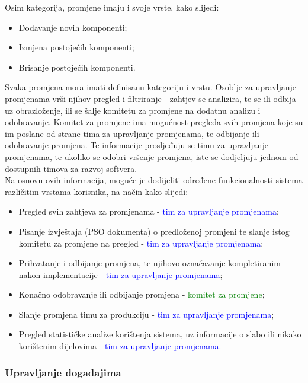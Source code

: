 \documentclass[12pt,a4paper]{article}
\begin{document}
Osim kategorija, promjene imaju i svoje vrste, kako slijedi:

\begin{itemize}
\renewcommand\labelitemi{-}
\item Dodavanje novih komponenti;
\item Izmjena postojećih komponenti;
\item Brisanje postojećih komponenti.
\end{itemize}

Svaka promjena mora imati definisanu kategoriju i vrstu. Osoblje za upravljanje promjenama vrši njihov pregled i filtriranje - zahtjev se analizira, te se ili odbija uz obrazloženje, ili se šalje komitetu za promjene na dodatnu analizu i odobravanje. Komitet za promjene ima mogućnost pregleda svih promjena koje su im poslane od strane tima za upravljanje promjenama, te odbijanje ili odobravanje promjena. Te informacije prosljeđuju se timu za upravljanje promjenama, te ukoliko se odobri vršenje promjena, iste se dodjeljuju jednom od dostupnih timova za razvoj softvera. \\

Na osnovu ovih informacija, moguće je dodijeliti određene funkcionalnosti sistema različitim vrstama korisnika, na način kako slijedi:

\begin{itemize}
\renewcommand\labelitemi{$\square$}
\item Pregled svih zahtjeva za promjenama - \textcolor{blue}{tim za upravljanje promjenama};
\item Pisanje izvještaja (PSO dokumenta) o predloženoj promjeni te slanje istog komitetu za promjene na pregled - \textcolor{blue}{tim za upravljanje promjenama};
\item Prihvatanje i odbijanje promjena, te njihovo označavanje kompletiranim nakon implementacije - \textcolor{blue}{tim za upravljanje promjenama};
\item Konačno odobravanje ili odbijanje promjena - \textcolor{green}{komitet za promjene};
\item Slanje promjena timu za produkciju - \textcolor{blue}{tim za upravljanje promjenama};
\item Pregled statističke analize korištenja sistema, uz informacije o slabo ili nikako korištenim dijelovima - \textcolor{blue}{tim za upravljanje promjenama}.
\end{itemize}

\subsubsection{Upravljanje događajima}
\end{document}
